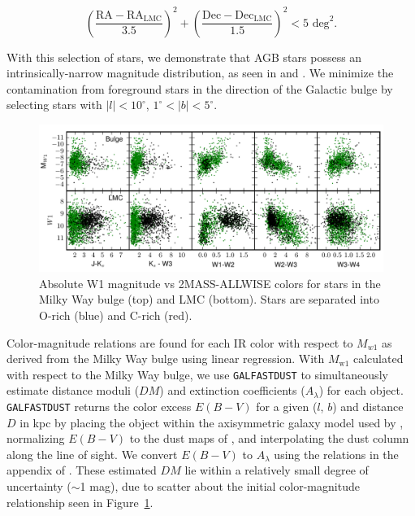 $$\displaystyle\left(\frac{\text{RA} - \text{RA}_\text{LMC}}{3.5}\right)^2 + \left(\frac{\text{Dec} - \text{Dec}_\text{LMC}}{1.5} \right)^2 < 5 \text{ deg}^2.$$

\noindent With this selection of stars, we demonstrate that AGB stars possess an intrinsically-narrow magnitude distribution, as seen in \cite{1985A&A...152L...1H} and \cite{2002MNRAS.337..749J}. 
We minimize the contamination from foreground stars in the direction of the Galactic bulge by selecting stars with $\lvert l\rvert < 10^\circ$, $1^\circ < \lvert b \rvert < 5^\circ$. 

\begin{figure}[h]
\includegraphics[width=6in]{figs/bulge_lmc_colormag.pdf}
\caption{{\footnotesize Absolute W1 magnitude vs 2MASS-ALLWISE colors for stars in the Milky Way bulge (top) and LMC (bottom). Stars are separated into O-rich (blue) and C-rich (red).}}
\label{fig:colormag}
\end{figure}

Color-magnitude relations are found for each IR color with respect to $M_{w1}$ as derived from the Milky Way bulge using linear regression. With $M_\text{w1}$ calculated with respect to the Milky Way bulge, we use {\tt GALFASTDUST} to simultaneously estimate distance moduli ($DM$) and extinction coefficients ($A_\lambda$) for each object. {\tt GALFASTDUST} returns the color excess $E(B-V)$ for a given ($l$, $b$) and distance $D$ in kpc by placing the object within the axisymmetric galaxy model used by \cite{2005AJ....130..659A}, normalizing $E(B-V)$ to the dust maps of \cite{1998ApJ...500..525S}, and interpolating the dust column along the line of sight. We convert $E(B-V)$ to $A_\lambda$ using the relations in the appendix of \cite{2014MNRAS.440.3430D}. These estimated $DM$ lie within a relatively small degree of uncertainty ($\sim$1 mag), due to scatter about the initial color-magnitude relationship seen in Figure~\ref{fig:colormag}.


